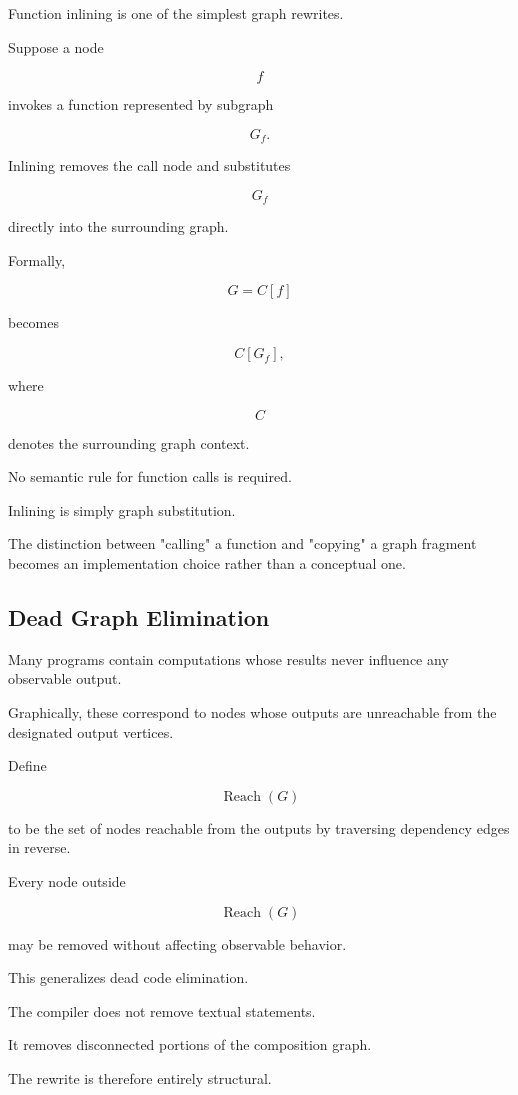 \documentclass[12pt,oneside]{article}
\begin{document}
Function inlining is one of the simplest graph rewrites.

Suppose a node

\[
f
\]

invokes a function represented by subgraph

\[
G_f.
\]

Inlining removes the call node and substitutes

\[
G_f
\]

directly into the surrounding graph.

Formally,

\[
G
=
C[f]
\]

becomes

\[
C[G_f],
\]

where

\[
C
\]

denotes the surrounding graph context.

No semantic rule for function calls is required.

Inlining is simply graph substitution.

The distinction between "calling" a function and "copying" a graph fragment becomes an implementation choice rather than a conceptual one.

\subsection{Dead Graph Elimination}

Many programs contain computations whose results never influence any observable output.

Graphically, these correspond to nodes whose outputs are unreachable from the designated output vertices.

Define

\[
\operatorname{Reach}(G)
\]

to be the set of nodes reachable from the outputs by traversing dependency edges in reverse.

Every node outside

\[
\operatorname{Reach}(G)
\]

may be removed without affecting observable behavior.

This generalizes dead code elimination.

The compiler does not remove textual statements.

It removes disconnected portions of the composition graph.

The rewrite is therefore entirely structural.
\end{document}
